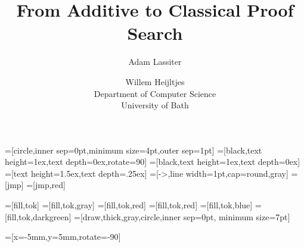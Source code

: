 \usepackage{amsmath}
\usepackage{amssymb}
\usepackage{amsthm}
\usepackage{bpextra}
\usepackage{float}
\usepackage{geometry}
\usepackage{latexsym}
\usepackage{natbib}
\usepackage{pdfpages}
\usepackage{subcaption}
\usepackage{tikz}
\usepackage{tkz-berge}
\usepackage{varwidth}

\usetikzlibrary{petri, topaths, positioning, decorations.pathmorphing}


\renewcommand{\bibsection}{}


\newcommand{\drawsquig}{\draw[-arr,
line join=round,
decorate, decoration={
    zigzag,
    segment length=4,
    amplitude=.9,post=lineto,
    post length=2pt
}]}

\newcommand\vc[1]{\vcenter{\hbox{#1}}}

\newcommand\atom[1]{%
 \ifx#11a\else%
 \ifx#12b\else%
 \ifx#13c\else%
 \fi\fi\fi
}

\newcommand\0{0}
\newcommand\1{1}
\newcommand\+{+}
\renewcommand\*{\times}

\newcommand{\tightplus}{\!+\!}
\newcommand{\tighttimes}{\!\*\!}
\newcommand\subs[1]{\mathsf{|#1|}}

=[circle,inner sep=0pt,minimum size=4pt,outer sep=1pt]
=[black,text height=1ex,text depth=0ex,rotate=90]
=[black,text height=1ex,text depth=0ex]%
=[text height=1.5ex,text depth=.25ex]
=[->,line width=1pt,cap=round,gray]
=[jmp]
=[jmp,red]

=[fill,tok]
=[fill,tok,gray]
=[fill,tok,red]
=[fill,tok,red]
=[fill,tok,blue]
=[fill,tok,darkgreen]
=[draw,thick,gray,circle,inner sep=0pt, minimum size=7pt]

=[x=-5mm,y=5mm,rotate=-90]

\def\deltaeq{\mathrel{\ensurestackMath{\stackon[1pt]{=}{\scriptstyle\Delta}}}}
\def\defeq{::=}
\def\seteq{:=}

\newcommand\dual{\overline}

\title{From Additive to Classical Proof Search}
\author{Adam Lassiter \and Willem Heijltjes\\Department of Computer Science\\University of Bath}
\date{}

